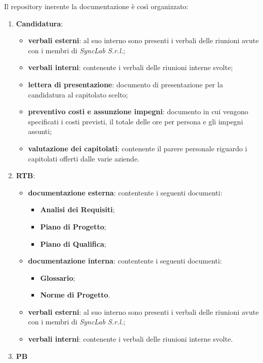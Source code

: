 Il repository inerente la documentazione è così organizzato:
\begin{enumerate}
	\item \textbf{Candidatura}:
	      \begin{itemize}
		      \item \textbf{verbali esterni}: al suo interno sono presenti i verbali delle riunioni avute con i membri di \textit{SyncLab S.r.l.};
		      \item \textbf{verbali interni}: contenente i verbali delle riunioni interne svolte;
		      \item \textbf{lettera di presentazione}: documento di presentazione per la candidatura al capitolato scelto;
		      \item \textbf{preventivo costi e assunzione impegni}: documento in cui vengono specificati i costi previsti, il totale delle ore per persona e gli impegni assunti;
		      \item \textbf{valutazione dei capitolati}: contenente il parere personale riguardo i capitolati offerti dalle varie aziende.
	      \end{itemize}
	\item \textbf{RTB}:
	      \begin{itemize}
		      \item \textbf{documentazione esterna}: contentente i seguenti documenti:
		            \begin{itemize}
			            \item \textbf{Analisi dei Requisiti};
			            \item \textbf{Piano di Progetto};
			            \item \textbf{Piano di Qualifica};
		            \end{itemize}
		      \item \textbf{documentazione interna}: contentente i seguenti documenti:
		            \begin{itemize}
			            \item \textbf{Glossario};
			            \item \textbf{Norme di Progetto}.
		            \end{itemize}
		      \item \textbf{verbali esterni}: al suo interno sono presenti i verbali delle riunioni avute con i membri di \textit{SyncLab S.r.l.};
		      \item \textbf{verbali interni}: contenente i verbali delle riunioni interne svolte.
	      \end{itemize}
	\item \textbf{PB} %
\end{enumerate}

